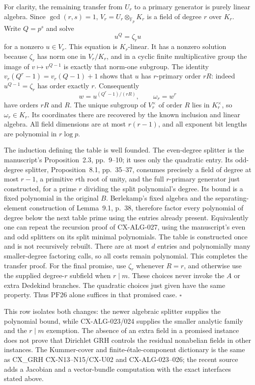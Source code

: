 For clarity, the remaining transfer from $U_r$ to a primary
generator is purely linear algebra. Since $\gcd(r,s)=1$,
$V_r=U_r\otimes_{\mathbb F_p}K_r$ is a field of degree $r$
over $K_r$. Write $Q=p^s$ and solve
\[
                      u^Q=\zeta_r u
\]
for a nonzero $u\in V_r$. This equation is $K_r$-linear.
It has a nonzero solution because $\zeta_r$ has norm one in
$V_r/K_r$, and in a cyclic finite multiplicative group the image
of $v\mapsto v^{Q-1}$ is exactly that norm-one subgroup.
The identity
$v_r(Q^r-1)=v_r(Q-1)+1$ shows that $u$ has $r$-primary
order $rR$: indeed $u^{Q-1}=\zeta_r$ has order exactly $r$.
Consequently
\[
             w=u^{(Q^r-1)/(rR)},\qquad\omega_r=w^r
\]
have orders $rR$ and $R$. The unique subgroup of $V_r^\times$
of order $R$ lies in $K_r^\times$, so $\omega_r\in K_r$.
Its coordinates there are recovered by the known inclusion and
linear algebra. All field dimensions are at most $r(r-1)$,
and all exponent bit lengths are polynomial in $r\log p$.

The induction defining the table is well founded. The even-degree
splitter is the manuscript's Proposition~2.3, pp.~9--10; it
uses only the quadratic entry. Its odd-degree splitter,
Proposition~8.1, pp.~35--37, consumes precisely a field of
degree at most $r-1$, a primitive $r$th root of unity, and the
full $r$-primary generator just constructed, for a prime
$r$ dividing the split polynomial's degree. Its bound is a fixed
polynomial in the original $B$. Berlekamp's fixed algebra and
the separating-element construction of Lemma~9.1, p.~38,
therefore factor every polynomial of degree below the next table
prime using the entries already present. Equivalently one can
repeat the recursion proof of CX-ALG-027, using the manuscript's
even and odd splitters on its split minimal polynomials. The
table is constructed once and is not recursively rebuilt. There
are at most $d$ entries and polynomially many smaller-degree
factoring calls, so all costs remain polynomial. This completes
the transfer proof. For the final promise, use $\zeta_r$ whenever
$R=r$, and otherwise use the supplied degree-$r$ subfield when
$r\mid m$. These choices never invoke the $A$ or extra Dedekind
branches. The quadratic choices just given have the same property.
Thus $\mathrm{PF26}$ alone suffices in that promised case.
\hfill$\square$

This row isolates both changes: the newer algebraic splitter supplies
the polynomial bound, while CX-ALG-023/024 supplies the smaller
analytic family and the $r\mid m$ exemption. The absence of an
extra field in a promised instance does not prove that Dirichlet GRH
controls the residual nonabelian fields in other instances. The
Kummer-cover and finite-\'etale-component dictionary is the same as
CX\_GRH CX-N13--N15/CX-U02 and CX-ALG-023--026; the recent source
adds a Jacobian and a vector-bundle computation with the exact
interfaces stated above.

